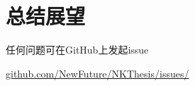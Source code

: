 \chapter{总结展望}

任何问题可在GitHub上发起issue 

\href{https://github.com/NewFuture/NKThesis/issues/new}{github.com/NewFuture/NKThesis/issues/} 